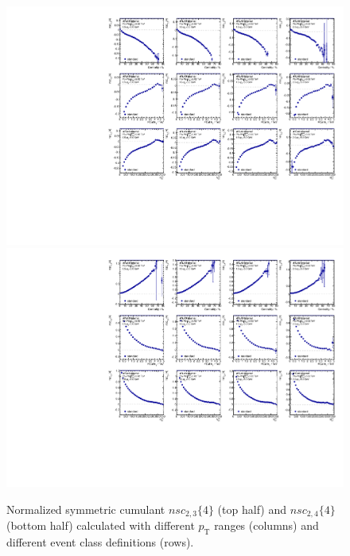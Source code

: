 \begin{figure}[H]
\centering
\includegraphics[width=.95\linewidth]{figs/sec_result/forQM/phy_nsc_Har2.pdf}
\includegraphics[width=.95\linewidth]{figs/sec_result/forQM/phy_nsc_Har3.pdf}
\caption{Normalized symmetric cumulant $nsc_{2,3}\{4\}$ (top half) and $nsc_{2,4}\{4\}$ (bottom half) calculated with different $p_\text{T}$ ranges (columns) and different event class definitions (rows).}
\label{fig:result_phy_nsc_Har23}
\end{figure}
